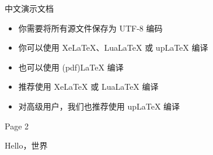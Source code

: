 \documentclass{ctexbeamer}
\begin{document}
\begin{frame}{中文演示文档}
\begin{itemize}
	\item 你需要将所有源文件保存为 UTF-8 编码
	\item 你可以使用 XeLaTeX、LuaLaTeX 或 upLaTeX 编译
	\item 也可以使用 (pdf)LaTeX 编译
	\item 推荐使用 XeLaTeX 或 LuaLaTeX 编译
	\item 对高级用户，我们也推荐使用 upLaTeX 编译
\end{itemize}
\end{frame}

\begin{frame}{Page 2}

Hello，世界

\end{frame}
\end{document}
